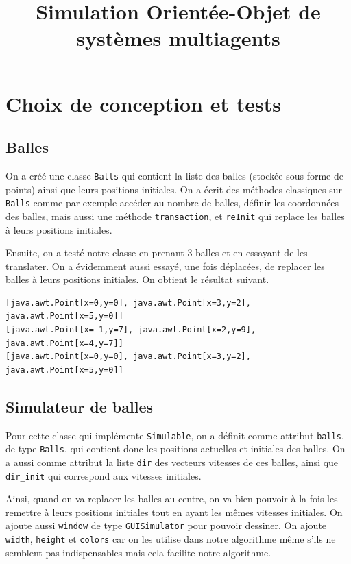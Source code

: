 \documentclass[a4paper, 11pt, french]{article}
\title{Simulation Orientée-Objet de systèmes multiagents}
\author{}
\date{}
\begin{document}
\maketitle

\section{Choix de conception et tests}

\subsection{Balles}

On a créé une classe \verb|Balls| qui contient la liste des balles (stockée sous forme de points) ainsi que leurs positions initiales. On a écrit des méthodes classiques sur \verb|Balls| comme par exemple accéder au nombre de balles, définir les coordonnées des balles, mais aussi une méthode \verb|transaction|, et \verb|reInit| qui replace les balles à leurs positions initiales.

Ensuite, on a testé notre classe en prenant 3 balles et en essayant de les translater. On a évidemment aussi essayé, une fois déplacées, de replacer les balles à leurs positions initiales. On obtient le résultat suivant.

\begin{verbatim}
[java.awt.Point[x=0,y=0], java.awt.Point[x=3,y=2], java.awt.Point[x=5,y=0]]
[java.awt.Point[x=-1,y=7], java.awt.Point[x=2,y=9], java.awt.Point[x=4,y=7]]
[java.awt.Point[x=0,y=0], java.awt.Point[x=3,y=2], java.awt.Point[x=5,y=0]]
\end{verbatim}

\subsection{Simulateur de balles}

Pour cette classe qui implémente \verb|Simulable|, on a définit comme attribut \verb|balls|, de type \verb|Balls|, qui contient donc les positions actuelles et initiales des balles. On a aussi comme attribut la liste \verb|dir| des vecteurs vitesses de ces balles, ainsi que \verb|dir_init| qui correspond aux vitesses initiales.

Ainsi, quand on va replacer les balles au centre, on va bien pouvoir à la fois les remettre à leurs positions initiales tout en ayant les mêmes vitesses initiales. On ajoute aussi \verb|window| de type \verb|GUISimulator| pour pouvoir dessiner. On ajoute \verb|width|, \verb|height| et \verb|colors| car on les utilise dans notre algorithme même s'ils ne semblent pas indispensables mais cela facilite notre algorithme.
\end{document}
